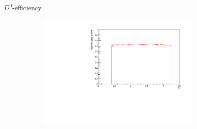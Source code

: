\documentclass[11pt]{beamer}
\begin{document}
\begin{frame}{$D^0$-efficiency}
\begin{figure}
\begin{subfigure}{0.45\textwidth}
\end{subfigure}
\begin{subfigure}{0.45\textwidth}
\includegraphics[width=0.9\textwidth]{up_pdf/single/pos/h_eta_reco_D0_pos.pdf}
\end{subfigure}
\end{figure}
\end{frame}
\end{document}
